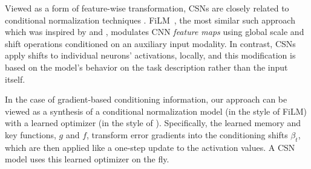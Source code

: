 \documentclass{article}
\begin{document}
Viewed as a form of feature-wise transformation, CSNs are closely related to conditional normalization techniques \cite{lei2015predicting,dumoulin2016learned,ghiasi2017exploring,de2017modulating,perez2017film}. FiLM~\cite{perez2017film}, the most similar such approach which was inspired by \citet{dumoulin2016learned} and \citet{ghiasi2017exploring}, modulates CNN \emph{feature maps} using global scale and shift operations conditioned on an auxiliary input modality. In contrast, CSNs apply shifts to individual neurons' activations, locally, and this modification is based on the model's behavior on the task description rather than the input itself.

In the case of gradient-based conditioning information, our approach can be viewed as a synthesis of a conditional normalization model (in the style of FiLM) with a learned optimizer (in the style of \citet{andrychowicz2016learning}).
Specifically, the learned memory and key functions, $g$ and $f$, transform error gradients into the conditioning shifts $\beta_t$, which are then applied like a one-step update to the activation values.
A CSN model uses this learned optimizer on the fly.
\end{document}
